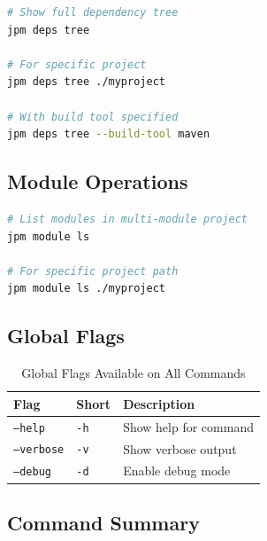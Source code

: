 \documentclass[12pt,a4paper]{report}
\begin{document}
\begin{lstlisting}[language=bash, caption=jpm deps tree - Show dependency tree]
# Show full dependency tree
jpm deps tree

# For specific project
jpm deps tree ./myproject

# With build tool specified
jpm deps tree --build-tool maven
\end{lstlisting}

\subsection{Module Operations}

\begin{lstlisting}[language=bash, caption=jpm module ls - List modules]
# List modules in multi-module project
jpm module ls

# For specific project path
jpm module ls ./myproject
\end{lstlisting}

\subsection{Global Flags}

\begin{table}[H]
\centering
\begin{tabular}{lll}
\toprule
\textbf{Flag} & \textbf{Short} & \textbf{Description} \\
\midrule
\texttt{--help} & \texttt{-h} & Show help for command \\
\texttt{--verbose} & \texttt{-v} & Show verbose output \\
\texttt{--debug} & \texttt{-d} & Enable debug mode \\
\bottomrule
\end{tabular}
\caption{Global Flags Available on All Commands}
\end{table}

\subsection{Command Summary}
\end{document}
